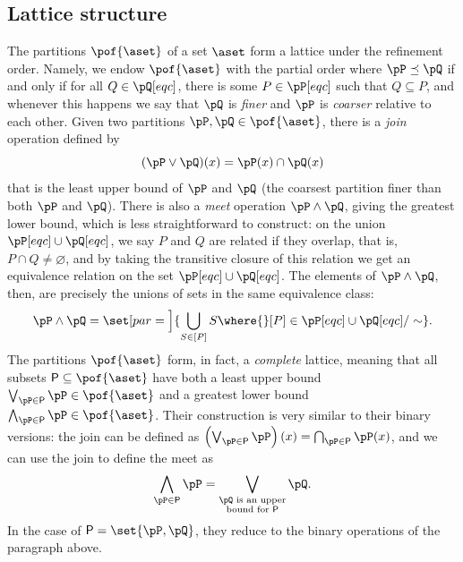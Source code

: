 \documentclass[../main]{subfiles}
\begin{document}
\subsection{Lattice structure}
\newcommand{\sfP}{\textsf{P}}
The partitions \(\pof{\aset}\) of a set \(\aset\) form a lattice under the refinement order. Namely, we endow \(\pof{\aset}\) with the partial order where \(\pP \preceq \pQ\) if and only if for all \(Q \in \pQ[eqc]\), there is some \(P \in \pP[eqc]\) such that \(Q \subseteq P\), and whenever this happens we say that \(\pQ\) is \emph{finer} and \(\pP\) is \emph{coarser} relative to each other. Given two partitions \(\pP, \pQ \in \pof{\aset}\), there is a \emph{join} operation defined by
\begin{equation*}
  (\pP \vee \pQ)(x) = \pP(x) \cap \pQ(x)
\end{equation*}
that is the least upper bound of \(\pP\) and \(\pQ\) (the coarsest partition finer than both \(\pP\) and \(\pQ\)). There is also a \emph{meet} operation \(\pP \wedge \pQ\), giving the greatest lower bound, which is less straightforward to construct: on the union \(\pP[eqc] \cup \pQ[eqc]\), we say \(P\) and \(Q\) are related if they overlap, that is, \(P \cap Q \neq \varnothing\), and by taking the transitive closure of this relation we get an equivalence relation on the set \(\pP[eqc] \cup \pQ[eqc]\). The elements of \(\pP \wedge \pQ\), then, are precisely the unions of sets in the same equivalence class:
\begin{equation*}
  \pP \wedge \pQ =  \set[par = \Big]{ \bigcup_{S \in [P]} S \where{} [P] \in \pP[eqc] \cup \pQ[eqc] / \sim}.
\end{equation*}
The partitions \(\pof{\aset}\) form, in fact, a \emph{complete} lattice, meaning that all subsets \(\sfP \subseteq \pof{\aset}\) have both a least upper bound \(\bigvee_{\pP \in \sfP}\pP \in \pof{\aset}\) and a greatest lower bound \(\bigwedge_{\pP \in \sfP}\pP \in \pof{\aset}\). Their construction is very similar to their binary versions: the join can be defined as \(\left( \bigvee_{\pP \in \sfP}\pP \right)(x) = \bigcap_{\pP \in \sfP}\pP(x)\), and we can use the join to define the meet as
\begin{equation*}
  \bigwedge_{\pP \in \sfP}\pP = \bigvee_{\substack{\pQ \text{ is an upper}\\\text{bound for }\sfP}}\pQ.
\end{equation*}
In the case of  \(\sfP = \set{\pP, \pQ}\), they reduce to the binary operations of the paragraph above.
\end{document}

